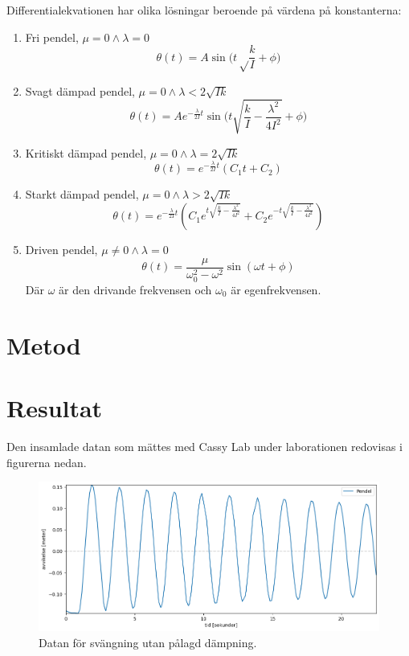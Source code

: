 \documentclass[12pt, a4paper]{article}
\begin{document}
Differentialekvationen har olika lösningar beroende på värdena på konstanterna:
\begin{enumerate}
    \item Fri pendel, $\mu=0\land\lambda=0$
    \begin{equation}\label{eq:fri_pendel}
        \theta(t)=A\sin\biggl(t\sqrt\frac{k}{I}+\phi\biggr)
    \end{equation}
    \item Svagt dämpad pendel, $\mu=0\land\lambda<2\sqrt{Ik}$
    \begin{equation}
        \theta(t)=Ae^{-\frac{\lambda}{2I}t}\sin\biggl(t\sqrt{\frac{k}{I}-\frac{\lambda^2}{4I^2}}+\phi\biggr)
    \end{equation}
    \item Kritiskt dämpad pendel, $\mu=0\land\lambda=2\sqrt{Ik}$
    \begin{equation}
        \theta(t)=e^{-\frac{\lambda}{2I}t}\left(C_1t+C_2\right)
    \end{equation}
    \item Starkt dämpad pendel, $\mu=0\land\lambda>2\sqrt{Ik}$
    \begin{equation}
        \theta(t)=e^{-\frac{\lambda}{2I}t}\left(C_1e^{t\sqrt{\frac{k}{I}-\frac{\lambda^2}{4I^2}}}+C_2e^{-t\sqrt{\frac{k}{I}-\frac{\lambda^2}{4I^2}}}\right)
    \end{equation}
    \item Driven pendel, $\mu\neq0\land\lambda=0$
    \begin{equation}
        \theta(t)=\frac{\mu}{\omega_0^2-\omega^2}\sin\left(\omega t+\phi\right)
    \end{equation}
    Där $\omega$ är den drivande frekvensen och $\omega_0$ är egenfrekvensen.
\end{enumerate}
\section{Metod}

\section{Resultat}
Den insamlade datan som mättes med Cassy Lab under laborationen redovisas i figurerna nedan. 

\begin{figure}[hp]
    \includegraphics[width=\textwidth]{graf_egenfrekvens}
    \caption{Datan för svängning utan pålagd dämpning.}
    \label{fig:data_egenfrekvens}
\end{figure}
\end{document}
